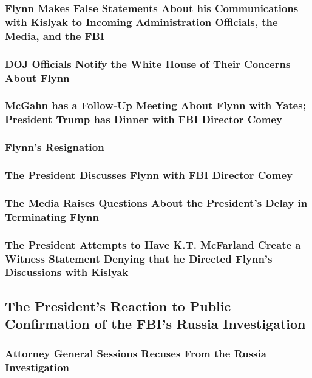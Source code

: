 \subsubsection{Flynn Makes False Statements About his Communications with Kislyak to Incoming Administration Officials, the Media, and the FBI}

\subsubsection{DOJ Officials Notify the White House of Their Concerns About Flynn}

\subsubsection{McGahn has a Follow-Up Meeting About Flynn with Yates; President Trump has Dinner with FBI Director Comey}

\subsubsection{Flynn’s Resignation}

\subsubsection{The President Discusses Flynn with FBI Director Comey}

\subsubsection{The Media Raises Questions About the President’s Delay in Terminating Flynn}

\subsubsection{The President Attempts to Have K.T. McFarland Create a Witness Statement Denying that he Directed Flynn’s Discussions with Kislyak}

\subsection{The President’s Reaction to Public Confirmation of the FBI’s Russia Investigation}

\subsubsection{Attorney General Sessions Recuses From the Russia Investigation}


